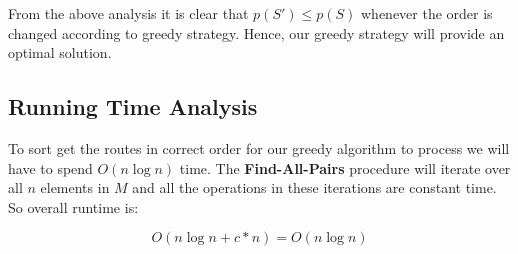 \documentclass[8pt]{article}
\begin{document}
From the above analysis it is clear that $p(S') \leq p(S)$ whenever the order is changed according to greedy strategy. Hence, our greedy strategy will provide an optimal solution.

\subsection{Running Time Analysis}
To sort get the routes in correct order for our greedy algorithm to process we will have to spend $O(n\log{n})$ time. The \textbf{Find-All-Pairs} procedure will iterate over all $n$ elements in $M$ and all the operations in these iterations are constant time. So overall runtime is:


$$O(n \log{n} + c*n) = O(n \log{n})$$
\end{document}
